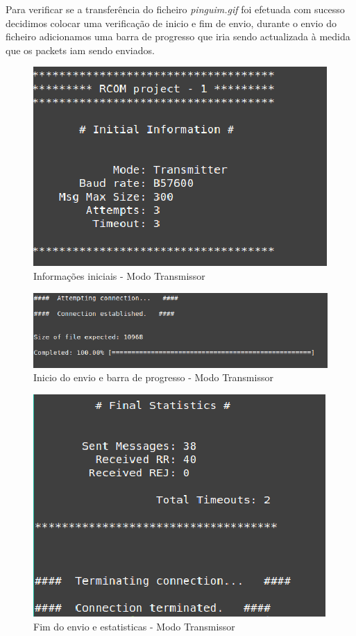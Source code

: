 \documentclass[11pt]{article}
\begin{document}
Para verificar se a transferência do ficheiro \textit{pinguim.gif} foi efetuada com sucesso decidimos colocar uma verificação de inicio e fim de envio,  durante o envio do ficheiro adicionamos uma barra de progresso que iria sendo actualizada à medida que os packets iam sendo enviados. 

\begin{figure}[h!]
\begin{center}
\includegraphics[scale=0.6]{trans1.png}
\caption{Informações iniciais - Modo Transmissor}
\label{fig:codigoFigura}
\end{center}
\end{figure}

\begin{figure}[h!]
\begin{center}
\includegraphics[scale=0.6]{trans2.png}
\caption{Inicio do envio e barra de progresso - Modo Transmissor}
\label{fig:codigoFigura}
\end{center}
\end{figure}

\begin{figure}[h!]
\begin{center}
\includegraphics[scale=0.6]{trans3.png}
\caption{Fim do envio e estatisticas - Modo Transmissor}
\label{fig:codigoFigura}
\end{center}
\end{figure}
\end{document}
